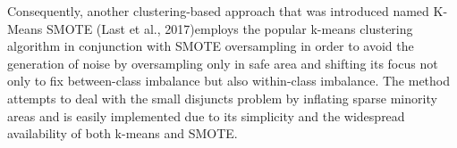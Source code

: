 \documentclass[parskip=full]{scrartcl}
\begin{document}
Consequently, another clustering-based approach that was introduced named K-Means SMOTE (Last et al., 2017)employs the popular k-means clustering algorithm in conjunction with SMOTE oversampling in order to avoid the generation of noise by oversampling only in safe area and shifting its focus not only to fix between-class imbalance but also within-class imbalance. The method attempts to deal with the small disjuncts problem by inflating sparse minority areas and is easily implemented due to its simplicity and the widespread availability of both k-means and SMOTE.



\end{document}
